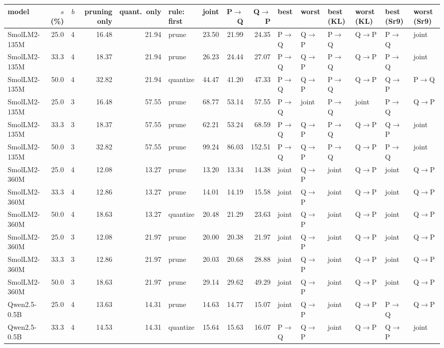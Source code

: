 \documentclass{article}
\begin{document}
\begin{longtable}{lrrrrlrrrllllll}
\toprule model & $s$ (\%) & $b$ & pruning only & quant.\ only & rule: first & joint & P$\to$Q & Q$\to$P & best & worst & best (KL) & worst (KL) & best (Sr9) & worst (Sr9) \\ \midrule \endhead
SmolLM2-135M & 25.0 & 4 & 16.48 & 21.94 & prune & 23.50 & 21.99 & 24.35 & P$\to$Q & Q$\to$P & P$\to$Q & Q$\to$P & P$\to$Q & joint \\
SmolLM2-135M & 33.3 & 4 & 18.37 & 21.94 & prune & 26.23 & 24.44 & 27.07 & P$\to$Q & Q$\to$P & P$\to$Q & Q$\to$P & P$\to$Q & joint \\
SmolLM2-135M & 50.0 & 4 & 32.82 & 21.94 & quantize & 44.47 & 41.20 & 47.33 & P$\to$Q & Q$\to$P & P$\to$Q & Q$\to$P & Q$\to$P & P$\to$Q \\
SmolLM2-135M & 25.0 & 3 & 16.48 & 57.55 & prune & 68.77 & 53.14 & 57.55 & P$\to$Q & joint & P$\to$Q & joint & P$\to$Q & Q$\to$P \\
SmolLM2-135M & 33.3 & 3 & 18.37 & 57.55 & prune & 62.21 & 53.24 & 68.59 & P$\to$Q & Q$\to$P & P$\to$Q & Q$\to$P & Q$\to$P & joint \\
SmolLM2-135M & 50.0 & 3 & 32.82 & 57.55 & prune & 99.24 & 86.03 & 152.51 & P$\to$Q & Q$\to$P & P$\to$Q & Q$\to$P & P$\to$Q & joint \\
SmolLM2-360M & 25.0 & 4 & 12.08 & 13.27 & prune & 13.20 & 13.34 & 14.38 & joint & Q$\to$P & joint & Q$\to$P & joint & Q$\to$P \\
SmolLM2-360M & 33.3 & 4 & 12.86 & 13.27 & prune & 14.01 & 14.19 & 15.58 & joint & Q$\to$P & joint & Q$\to$P & joint & Q$\to$P \\
SmolLM2-360M & 50.0 & 4 & 18.63 & 13.27 & quantize & 20.48 & 21.29 & 23.63 & joint & Q$\to$P & joint & Q$\to$P & joint & Q$\to$P \\
SmolLM2-360M & 25.0 & 3 & 12.08 & 21.97 & prune & 20.00 & 20.38 & 21.97 & joint & Q$\to$P & joint & Q$\to$P & joint & Q$\to$P \\
SmolLM2-360M & 33.3 & 3 & 12.86 & 21.97 & prune & 20.03 & 20.68 & 28.88 & joint & Q$\to$P & joint & Q$\to$P & joint & Q$\to$P \\
SmolLM2-360M & 50.0 & 3 & 18.63 & 21.97 & prune & 29.14 & 29.62 & 49.29 & joint & Q$\to$P & joint & Q$\to$P & joint & Q$\to$P \\
Qwen2.5-0.5B & 25.0 & 4 & 13.63 & 14.31 & prune & 14.63 & 14.77 & 15.07 & joint & Q$\to$P & joint & Q$\to$P & P$\to$Q & Q$\to$P \\
Qwen2.5-0.5B & 33.3 & 4 & 14.53 & 14.31 & quantize & 15.64 & 15.63 & 16.07 & P$\to$Q & Q$\to$P & joint & Q$\to$P & Q$\to$P & joint \\

\end{longtable}
\end{document}
